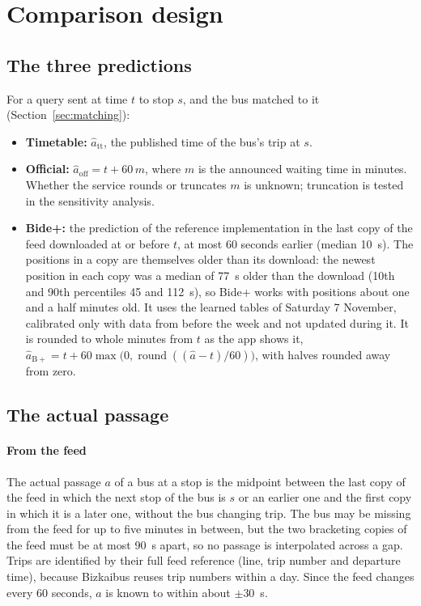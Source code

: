 

\section{Comparison design}
\label{sec:design}

\subsection{The three predictions}

For a query sent at time $t$ to stop $s$, and the bus matched to it (Section~\ref{sec:matching}):
\begin{itemize}
  \item \textbf{Timetable:} $\hat a_{\mathrm{tt}}$, the published time of the bus's trip at $s$.
  \item \textbf{Official:} $\hat a_{\mathrm{off}} = t + 60\,m$, where $m$ is the announced waiting time in minutes. Whether
        the service rounds or truncates $m$ is unknown; truncation is tested in the sensitivity analysis.
  \item \textbf{Bide+:} the prediction of the reference implementation in the last copy of the feed downloaded at or
        before $t$, at most 60 seconds earlier (median 10~s). The positions in a copy are themselves older than its
        download: the newest position in each copy was a median of 77~s older than the download (10th and 90th
        percentiles 45 and 112~s), so Bide+ works with positions about one and a half minutes old. It uses the learned tables of Saturday 7 November,
        calibrated only with data from before the week and not updated during it. It is rounded to whole minutes from
        $t$ as the app shows it, $\hat a_{\mathrm{B+}} = t + 60\max\bigl(0, \operatorname{round}((\hat a - t)/60)\bigr)$, with halves rounded away
        from zero.
\end{itemize}

\subsection{The actual passage}
\label{sec:passage}

\paragraph{From the feed} The actual passage $a$ of a bus at a stop is the midpoint between the last copy of the feed in
which the next stop of the bus is $s$ or an earlier one and the first copy in which it is a later one, without the bus
changing trip. The bus may be missing from the feed for up to five minutes in between, but the two bracketing copies of
the feed must be at most 90~s apart, so no passage is interpolated across a gap. Trips are identified by their full feed
reference (line, trip number and departure time), because Bizkaibus reuses trip numbers within a day. Since the feed
changes every 60 seconds, $a$ is known to within about $\pm30$~s.

